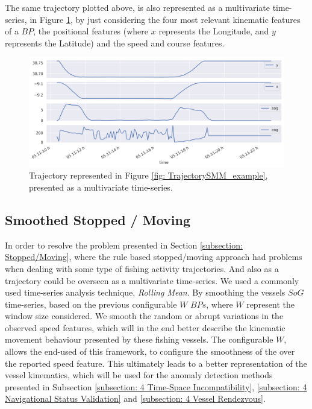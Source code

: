 The same trajectory plotted above, is also represented as a multivariate time-series, in Figure \ref{fig: MTimeSeries_example}, by just considering the four most relevant kinematic features of a $BP$, the positional features (where $x$ represents the Longitude, and $y$ represents the Latitude) and the speed and course features. 


\begin{figure}[H]
\centering
\includegraphics[width=\textwidth]{figures/Ch3/ts_example.png}
\caption{Trajectory represented in Figure \ref{fig: TrajectorySMM_example}, presented as a multivariate time-series.}
\label{fig: MTimeSeries_example}
\end{figure}

\subsection{Smoothed Stopped / Moving}
\label{subsection: Smoothed Stopped / Moving}
In order to resolve the problem presented in Section \ref{subsection: Stopped/Moving}, where the rule based stopped/moving approach had problems when dealing with some type of fishing activity trajectories. 
And also as a trajectory could be overseen as a multivariate time-series. We used a commonly used time-series analysis technique, \emph{Rolling Mean}. 
By smoothing the vessels $SoG$ time-series, based on the previous configurable $W$ $BPs$, where $W$ represent the window size considered. We smooth the random or abrupt variations in the observed speed features, which will in the end better describe the kinematic movement behaviour presented by these fishing vessels. 
The configurable $W$, allows the end-used of this framework, to configure the smoothness of the over the reported speed feature. This ultimately leads to a better representation of the vessel kinematics, which will be used for the anomaly detection methods presented in Subsection \ref{subsection: 4 Time-Space Incompatibility}, \ref{subsection: 4 Navigational Status Validation} and \ref{subsection: 4 Vessel Rendezvous}.

